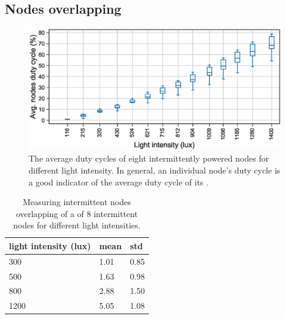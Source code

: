\subsection{Nodes overlapping}
\begin{figure}[t]
		\centering
		\includegraphics[width=\columnwidth]{figures/cis_dutyCycle.eps}
		\caption{The average duty cycles of eight intermittently powered nodes for different light intensity. In general, an individual node's duty cycle is a good indicator of the average duty cycle of its \sys.}
		\label{fig:cis_nodes_dutyCycle}
\end{figure} 

\begin{table}
		\centering
		\caption{Measuring intermittent nodes overlapping of a \sys of 8 intermittent nodes for different light intensities.}
		\begin{tabular}{lll}
				\hline
				light intensity (lux) & mean & std    \\
				\hline
				300	                  & 1.01 & 0.85   \\
				500                   & 1.63 & 0.98   \\
				800                   & 2.88 & 1.50   \\
				1200                  & 5.05 & 1.08   \\
				\hline
		\end{tabular}
		\label{tab:clusters}
\end{table}


